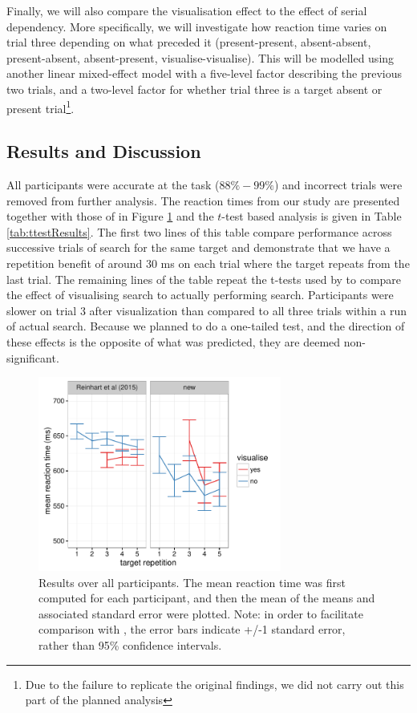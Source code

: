 \documentclass[smallextended]{svjour3}       %
\begin{document}
Finally, we will also compare the visualisation effect to the effect of serial dependency. More specifically, we will investigate how reaction time varies on trial three depending on what preceded it (present-present, absent-absent, present-absent, absent-present, visualise-visualise). This will be modelled using another linear mixed-effect model with a five-level factor describing the previous two trials, and a two-level factor for whether trial three is a target absent or present trial\footnote{Due to the failure to replicate the original findings, we did not carry out this part of the planned analysis}.

\subsection{Results and Discussion}

All participants were accurate at the task ($88\%-99\%$) and incorrect trials were removed from further analysis. The reaction times from our study are presented together with those of \cite{reinhart2015} in Figure \ref{fig:meanResults} and the $t$-test based analysis is given in Table \ref{tab:ttestResults}. The first two lines of this table compare performance across successive trials of search for the same target and demonstrate that we have a repetition benefit of around 30 ms on each trial where the target repeats from the last trial. The remaining lines of the table repeat the t-tests used by \cite{reinhart2015} to compare the effect of visualising search to actually performing search. Participants were slower on trial 3 after visualization than compared to all three trials within a run of actual search. Because we planned to do a one-tailed test, and the direction of these effects is the opposite of what was predicted, they are deemed non-significant.  

\begin{figure}
\centering
\includegraphics[width=8cm]{figs/meanResults.pdf}
\caption{Results over all participants. The mean reaction time was first computed for each participant, and then the mean of the means and associated standard error were plotted. Note: in order to facilitate comparison with \cite{reinhart2015}, the error bars indicate +/-1 standard error, rather than 95\% confidence intervals.}
\label{fig:meanResults}
\end{figure}
\end{document}
